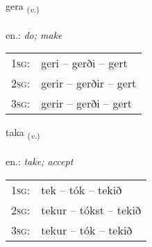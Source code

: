 \documentclass[frontgrid, backgrid]{flacards}\usepackage[]{graphicx}\usepackage[]{xcolor}
\begin{document}
{gera \small{\textsubscript{(\textit{v.})}} \\[1ex] %
\textphonetic{[cɛːra]} \\
en.: \emph{do; make} \\  [2ex]
\renewcommand*{\arraystretch}{0.8}
\begin{tabular}{p{1cm}l}
\textsc{1sg}: & geri -- gerði -- gert \\ 
\textsc{2sg}: & gerir -- gerðir -- gert \\ 
\textsc{3sg}: & gerir -- gerði -- gert \\ 
\end{tabular}
}

\renewcommand{\flhead}{\vskip5pt \fboxsep=0pt {\small\bfseries\footnotesize Sagnorð | Verb}}
\renewcommand{\fcfoot}{\vskip5pt \fboxsep=0pt \hspace{2pt}{\small\bfseries\footnotesize 1K}}

\renewcommand{\blhead}{\vskip5pt {\small\bfseries\footnotesize Sagnorð | Verb }}
\renewcommand{\bcfoot}{\vskip5pt \hspace{2pt}{\small\bfseries\footnotesize 1K}}


{taka \small{\textsubscript{(\textit{v.})}} \\[1ex] %
\textphonetic{[tʰaːka]} \\
en.: \emph{take; accept} \\  [2ex]
\renewcommand*{\arraystretch}{0.8}
\begin{tabular}{p{1cm}l}
\textsc{1sg}: & tek -- tók -- tekið \\ 
\textsc{2sg}: & tekur -- tókst -- tekið \\ 
\textsc{3sg}: & tekur -- tók -- tekið \\ 
\end{tabular}
}


\renewcommand{\flhead}{\vskip5pt \fboxsep=0pt {\small\bfseries\footnotesize Samtenging | Conjuction}}
\renewcommand{\fcfoot}{\vskip5pt \fboxsep=0pt \hspace{2pt}{\small\bfseries\footnotesize 1K}}
\end{document}
